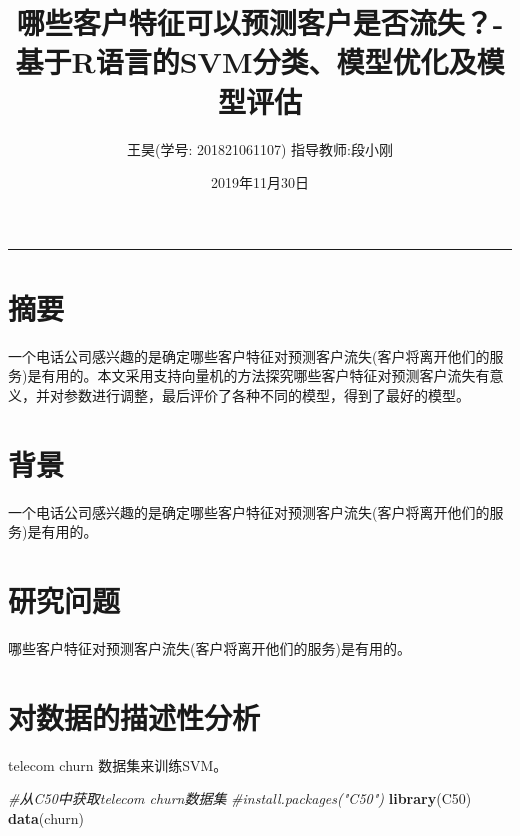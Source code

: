 \documentclass[
]{article}
\title{哪些客户特征可以预测客户是否流失？-基于R语言的SVM分类、模型优化及模型评估}
\author{王昊(学号: 201821061107) 指导教师:段小刚}
\date{2019年11月30日}
\newenvironment{Shaded}{\begin{snugshade}}{\end{snugshade}}
\newcommand{\CommentTok}[1]{\textcolor[rgb]{0.56,0.35,0.01}{\textit{#1}}}
\newcommand{\KeywordTok}[1]{\textcolor[rgb]{0.13,0.29,0.53}{\textbf{#1}}}
\newcommand{\NormalTok}[1]{#1}
\begin{document}
\maketitle

{
\setcounter{tocdepth}{4}
\tableofcontents
}
\begin{center}\rule{0.5\linewidth}{\linethickness}\end{center}

\hypertarget{ux6458ux8981}{%
\section{摘要}\label{ux6458ux8981}}

一个电话公司感兴趣的是确定哪些客户特征对预测客户流失(客户将离开他们的服务)是有用的。本文采用支持向量机的方法探究哪些客户特征对预测客户流失有意义，并对参数进行调整，最后评价了各种不同的模型，得到了最好的模型。

\hypertarget{ux80ccux666f}{%
\section{背景}\label{ux80ccux666f}}

一个电话公司感兴趣的是确定哪些客户特征对预测客户流失(客户将离开他们的服务)是有用的。

\hypertarget{ux7814ux7a76ux95eeux9898}{%
\section{研究问题}\label{ux7814ux7a76ux95eeux9898}}

哪些客户特征对预测客户流失(客户将离开他们的服务)是有用的。

\hypertarget{ux5bf9ux6570ux636eux7684ux63cfux8ff0ux6027ux5206ux6790}{%
\section{对数据的描述性分析}\label{ux5bf9ux6570ux636eux7684ux63cfux8ff0ux6027ux5206ux6790}}

telecom churn 数据集来训练SVM。

\begin{Shaded}
\begin{Highlighting}[]
\CommentTok{#从C50中获取telecom churn数据集}
\CommentTok{#install.packages("C50")}
\KeywordTok{library}\NormalTok{(C50)}
\KeywordTok{data}\NormalTok{(churn)}
\end{Highlighting}
\end{Shaded}
\end{document}
